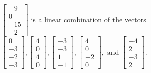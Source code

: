 \begin{exercise}
\begin{exerciseStatement}
  \end{exerciseStatement}
  \begin{exerciseAnswer}
   \(\left[\begin{array}{c}
-9 \\
0 \\
-15 \\
-2
\end{array}\right]\) 
  	 is  
	a linear combination of the vectors \(\left[\begin{array}{c}
0 \\
-3 \\
-2 \\
-3
\end{array}\right] , \left[\begin{array}{c}
4 \\
0 \\
4 \\
0
\end{array}\right] , \left[\begin{array}{c}
-3 \\
-3 \\
1 \\
-1
\end{array}\right] , \left[\begin{array}{c}
4 \\
0 \\
-2 \\
0
\end{array}\right] , \text{ and } \left[\begin{array}{c}
-4 \\
2 \\
-3 \\
2
\end{array}\right]\).

	
  


  \end{exerciseAnswer}
\end{exercise}
